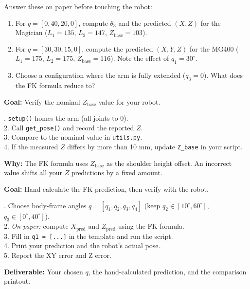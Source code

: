 \documentclass[11pt,a4paper]{article}
\begin{document}
\begin{tcolorbox}[setupbox, title={Pre-Lab Worksheet (complete before the lab session)}]
  Answer these on paper before touching the robot:
  \begin{enumerate}
    \item For $q=[0, 40, 20, 0]$, compute $\theta_3$ and the predicted $(X, Z)$
          for the Magician ($L_1{=}135$, $L_2{=}147$, $Z_{\text{base}}{=}103$).
    \item For $q=[30, 30, 15, 0]$, compute the predicted $(X, Y, Z)$ for the MG400
          ($L_1{=}175$, $L_2{=}175$, $Z_{\text{base}}{=}116$). Note the effect of $q_1 = 30^{\circ}$.
    \item Choose a configuration where the arm is fully extended ($q_3=0$).
          What does the FK formula reduce to?
  \end{enumerate}
\end{tcolorbox}

\vspace{6pt}

\begin{tcolorbox}[infobox, title={Task 0 — Measure $Z_\text{base}$ (5 min)}]
  \textbf{Goal:} Verify the nominal $Z_{\text{base}}$ value for your robot.

  . \texttt{setup()} homes the arm (all joints to 0). \\
  2. Call \texttt{get\_pose()} and record the reported $Z$. \\
  3. Compare to the nominal value in \texttt{utils.py}. \\
  4. If the measured $Z$ differs by more than 10 mm, update \texttt{Z\_base} in your script.

  \smallskip
  \textbf{Why:} The FK formula uses $Z_{\text{base}}$ as the shoulder height offset.
  An incorrect value shifts all your $Z$ predictions by a fixed amount.
\end{tcolorbox}

\vspace{6pt}

\begin{tcolorbox}[infobox, title={Task 1 — Single Configuration (15 min)}]
  \textbf{Goal:} Hand-calculate the FK prediction, then verify with the robot.

  . Choose body-frame angles $q = [q_1, q_2, q_3, q_4]$ (keep $q_2 \in [10^{\circ},60^{\circ}]$,
     $q_3 \in [0^{\circ},40^{\circ}]$). \\
  2. \emph{On paper:} compute $X_\text{pred}$ and $Z_\text{pred}$ using the FK formula. \\
  3. Fill in \texttt{q1 = [...]} in the template and run the script. \\
  4. Print your prediction and the robot's actual pose. \\
  5. Report the XY error and Z error.

  \smallskip
  \textbf{Deliverable:} Your chosen $q$, the hand-calculated prediction, and the comparison printout.
\end{tcolorbox}
\end{document}
